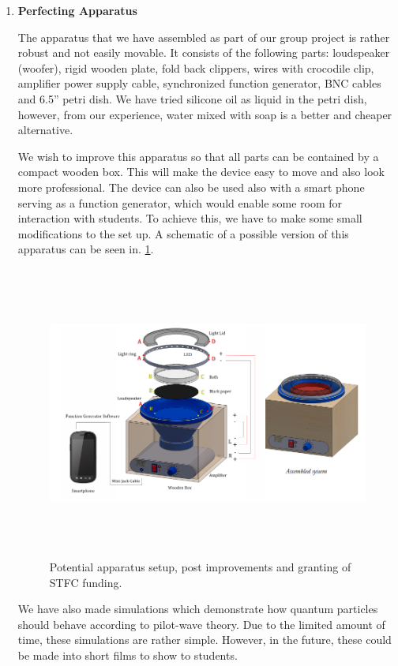 \begin{enumerate}
\item \textbf{Perfecting Apparatus}

The apparatus that we have assembled as part of our group project is rather robust and not easily movable. It consists of the following parts: loudspeaker (woofer), rigid wooden plate, fold back clippers, wires with crocodile clip, amplifier power supply cable, synchronized function generator, BNC cables and 6.5'' petri dish. We have tried silicone oil as liquid in the petri dish, however, from our experience, water mixed with soap is a better and cheaper alternative.

We wish to improve this apparatus so that all parts can be contained by a compact wooden box. This will make the device easy to move and also look more professional. The device can also be used also with a smart phone serving as a function generator, which would enable some room for interaction with students. To achieve this, we have to make some small modifications to the set up. A schematic of a possible version of this apparatus can be seen in.  \ref{fig:apparatus_diagram_STFC}.

\begin{figure}
\centering
    \includegraphics[width=16.14cm,height=9.647cm]{education/STFCproposal/Apparatus_STFC.png}
    \caption{Potential apparatus setup, post improvements and granting of STFC funding.}
    \label{fig:apparatus_diagram_STFC}
\end{figure}

We have also made simulations which demonstrate how quantum particles should behave according to pilot-wave theory. Due to the limited amount of time, these simulations are rather simple. However, in the future, these could be made into short films to show to students.


\end{enumerate}
